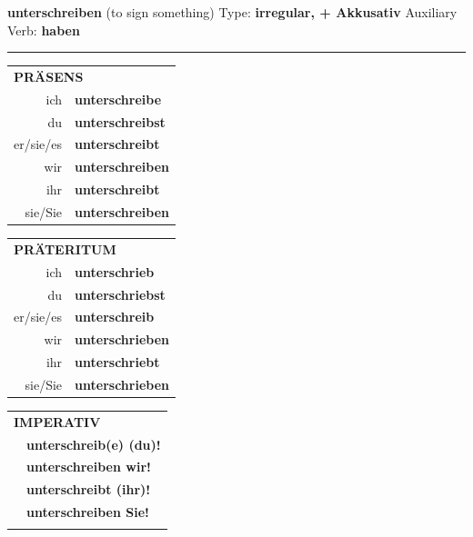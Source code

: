 \documentclass[10pt,a4paper]{revtex4-2}
\begin{document}
\begin{verbbox-acc}
    {\Large \bf unterschreiben} (to sign something) \hfill Type: \textbf{irregular, + Akkusativ} \hfill Auxiliary Verb: \textbf{haben} 
    
     \vspace{5pt}

    \hrule
    
    \vspace{5pt}

  \begin{tabular}{rl}
     \multicolumn{2}{l}{\textbf{PRÄSENS} }\\
    ich & \textbf{unterschreibe}\\
    du & \textbf{unterschreibst}\\
    er/sie/es & \textbf{unterschreibt}\\
    wir & \textbf{unterschreiben}\\
    ihr & \textbf{unterschreibt}\\
    sie/Sie & \textbf{unterschreiben}\\
  \end{tabular}
  \hfill
     \begin{tabular}{rl}
    \multicolumn{2}{l}{\textbf{PRÄTERITUM} }\\
    ich & \textbf{unterschrieb}\\
    du & \textbf{unterschriebst}\\
    er/sie/es & \textbf{unterschreib}\\
    wir & \textbf{unterschrieben}\\
    ihr & \textbf{unterschriebt}\\
    sie/Sie & \textbf{unterschrieben}\\
  \end{tabular}
  \hfill
  \begin{tabular}{rl}
     \multicolumn{2}{l}{\textbf{IMPERATIV} }\\
   & \textbf{unterschreib(e) (du)!}\\
   & \textbf{unterschreiben wir!}\\
   & \textbf{unterschreibt (ihr)!}\\
   & \textbf{unterschreiben Sie!}\\
   & \vspace{10pt}
  \end{tabular}

    \vspace{10pt}


\end{verbbox-acc}
\end{document}
